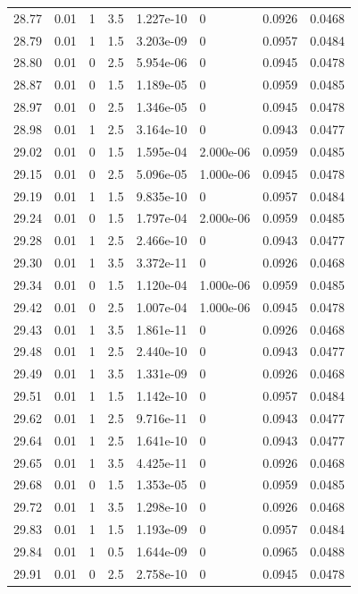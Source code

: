 \documentclass[preview]{standalone}
\begin{document}
{{{{{{{{{{{{{\begin{tabular}{L{1.2cm}C{1.2cm} C{0.3cm}C{0.5cm} C{1.4cm}C{1.4cm} C{1.4cm}C{1.4cm}}
  28.77  &  0.01  & 1     & 3.5 &  1.227e-10  & 0  & 0.0926 &  0.0468   \\ 
  28.79  &  0.01  & 1     & 1.5 &  3.203e-09  & 0  & 0.0957 &  0.0484   \\ 
  28.80  &  0.01  & 0     & 2.5 &  5.954e-06  & 0  & 0.0945 &  0.0478   \\ 
  28.87  &  0.01  & 0     & 1.5 &  1.189e-05  & 0  & 0.0959 &  0.0485   \\ 
  28.97  &  0.01  & 0     & 2.5 &  1.346e-05  & 0  & 0.0945 &  0.0478   \\ 
  28.98  &  0.01  & 1     & 2.5 &  3.164e-10  & 0  & 0.0943 &  0.0477   \\ 
  29.02  &  0.01  & 0     & 1.5 &  1.595e-04  & 2.000e-06  & 0.0959 &  0.0485   \\ 
  29.15  &  0.01  & 0     & 2.5 &  5.096e-05  & 1.000e-06  & 0.0945 &  0.0478   \\ 
  29.19  &  0.01  & 1     & 1.5 &  9.835e-10  & 0  & 0.0957 &  0.0484   \\ 
  29.24  &  0.01  & 0     & 1.5 &  1.797e-04  & 2.000e-06  & 0.0959 &  0.0485   \\ 
  29.28  &  0.01  & 1     & 2.5 &  2.466e-10  & 0  & 0.0943 &  0.0477   \\ 
  29.30  &  0.01  & 1     & 3.5 &  3.372e-11  & 0  & 0.0926 &  0.0468   \\ 
  29.34  &  0.01  & 0     & 1.5 &  1.120e-04  & 1.000e-06  & 0.0959 &  0.0485   \\ 
  29.42  &  0.01  & 0     & 2.5 &  1.007e-04  & 1.000e-06  & 0.0945 &  0.0478   \\ 
  29.43  &  0.01  & 1     & 3.5 &  1.861e-11  & 0  & 0.0926 &  0.0468   \\ 
  29.48  &  0.01  & 1     & 2.5 &  2.440e-10  & 0  & 0.0943 &  0.0477   \\ 
  29.49  &  0.01  & 1     & 3.5 &  1.331e-09  & 0  & 0.0926 &  0.0468   \\ 
  29.51  &  0.01  & 1     & 1.5 &  1.142e-10  & 0  & 0.0957 &  0.0484   \\ 
  29.62  &  0.01  & 1     & 2.5 &  9.716e-11  & 0  & 0.0943 &  0.0477   \\ 
  29.64  &  0.01  & 1     & 2.5 &  1.641e-10  & 0  & 0.0943 &  0.0477   \\ 
  29.65  &  0.01  & 1     & 3.5 &  4.425e-11  & 0  & 0.0926 &  0.0468   \\ 
  29.68  &  0.01  & 0     & 1.5 &  1.353e-05  & 0  & 0.0959 &  0.0485   \\ 
  29.72  &  0.01  & 1     & 3.5 &  1.298e-10  & 0  & 0.0926 &  0.0468   \\ 
  29.83  &  0.01  & 1     & 1.5 &  1.193e-09  & 0  & 0.0957 &  0.0484   \\ 
  29.84  &  0.01  & 1     & 0.5 &  1.644e-09  & 0  & 0.0965 &  0.0488   \\ 
  29.91  &  0.01  & 0     & 2.5 &  2.758e-10  & 0  & 0.0945 &  0.0478   \\ 
\hline 
\end{tabular} 

}}}}}}}}}}}}}
\end{document}
